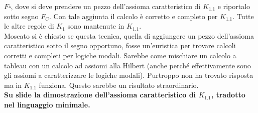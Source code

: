 \documentclass[a4paper,12pt, oneside]{book}
\begin{document}
$F\square$, dove si deve prendere un pezzo dell'assioma caratteristico di
$K_{1.1}$ e riportalo sotto segno $F_C$. Con tale aggiunta il calcolo è
corretto e completo per $K_{1.1}$. Tutte le altre regole di $K_1$ sono mantenute
in $K_{1.1}$.\\
Moscato si è chiesto se questa tecnica, quella di aggiungere un pezzo
dell'assioma caratteristico sotto il segno opportuno, fosse un'euristica per
trovare calcoli corretti e completi per logiche modali. Sarebbe come mischiare
un calcolo a tableau con un calcolo ad assiomi alla Hilbert (anche perché
effettivamente sono gli assiomi a caratterizzare le logiche modali). Purtroppo
non ha trovato risposta ma in $K_{1.1}$ funziona. Questo sarebbe un risultato
straordinario.\\ 
\textbf{Su slide la dimostrazione dell'assioma caratteristico di
  $K_{1.1}$, tradotto nel linguaggio minimale.}
\end{document}
